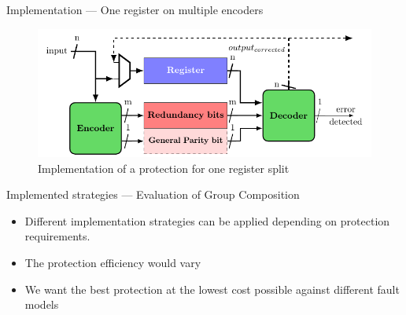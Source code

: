 \begin{frame}{Implementation — One register on multiple encoders}
    \begin{figure}
        \centering
        \includegraphics[width=.9\textwidth, page=6]{src/4_strategies/img/archi_contremesures.pdf}
        \caption{Implementation of a protection for one register split}
        \label{fig:secded_implem_splitted}
    \end{figure}
\end{frame}
\begin{frame}{Implemented strategies — Evaluation of Group Composition}
    \begin{block}{}
        \begin{itemize}
            \justifying
            \item Different implementation strategies can be applied depending on protection requirements.
            \item The protection efficiency would vary
            \item We want the best protection at the lowest cost possible against different fault models
        \end{itemize}
    \end{block}
\end{frame}

